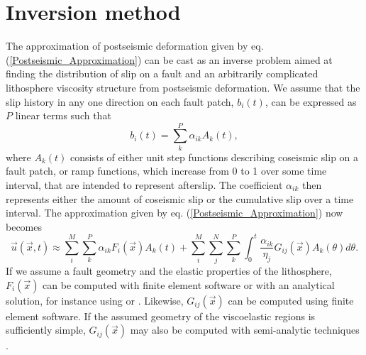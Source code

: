 \documentclass[extra,mreferee]{gji}
\begin{document}
\section{Inversion method}
The approximation of postseismic deformation given by eq.
(\ref{Postseismic_Approximation}) can be cast as an inverse problem
aimed at finding the distribution of slip on a fault and an
arbitrarily complicated lithosphere viscosity structure from
postseismic deformation. We assume that the slip history in any one
direction on each fault patch, $b_i(t)$, can be expressed as $P$ linear
terms such that
\begin{equation}
  b_i(t) = \sum_k^P \alpha_{ik}A_k(t),
\end{equation}
where $A_k(t)$ consists of either unit step functions describing
coseismic slip on a fault patch, or ramp functions, which increase
from 0 to 1 over some time interval, that are intended to represent
afterslip.  The coefficient $\alpha_{ik}$ then represents either the
amount of coseismic slip or the cumulative slip over a time interval.
The approximation given by eq. (\ref{Postseismic_Approximation}) now
becomes
\begin{equation}\label{Postseismic_Approximation2}
  \vec{u}(\vec{x},t) \approx
  \sum_i^M\sum_k^P\alpha_{ik}F_i(\vec{x})A_k(t) +
  \sum_i^M\sum_j^N\sum_k^P\int_0^t\frac{\alpha_{ik}}{\eta_j}G_{ij}(\vec{x})A_k(\theta)d\theta.
\end{equation}
If we assume a fault geometry and the elastic properties of the
lithosphere, $F_i(\vec{x})$ can be computed with finite element
software or with an analytical solution, for instance using
\citet{O1992} or \citet{M2007}. Likewise, $G_{ij}(\vec{x})$ can be
computed using finite element software.  If the assumed geometry of
the viscoelastic regions is sufficiently simple, $G_{ij}(\vec{x})$ may
also be computed with semi-analytic techniques
\citep[e.g.][]{P1997,FM2006,BF2010}.
\end{document}

